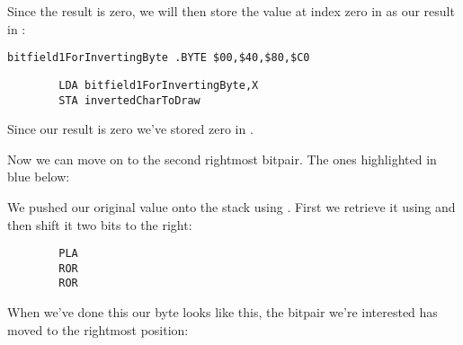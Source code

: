 Since the result is zero, we will then store the value at index zero in 
as our result in :

\begin{lstlisting}
bitfield1ForInvertingByte .BYTE $00,$40,$80,$C0
\end{lstlisting}
\begin{lstlisting}
        LDA bitfield1ForInvertingByte,X
        STA invertedCharToDraw
\end{lstlisting}

Since our result is zero we've stored zero in .

Now we can move on to the second rightmost bitpair. The ones highlighted in blue below:

\begin{figure}[H]
  {
    \setlength{\tabcolsep}{3.0pt}
    \setlength\cmidrulewidth{\lightrulewidth} %
    \begin{adjustbox}{width=4cm,center}
    \end{adjustbox}
  }
\end{figure}

We pushed our original value onto the stack using . First we retrieve it using 
and then shift it two bits to the right:

\begin{lstlisting}
        PLA
        ROR
        ROR
\end{lstlisting}

When we've done this our byte looks like this, the bitpair we're interested has moved to the rightmost
position:

